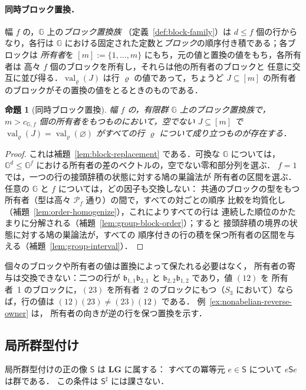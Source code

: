 \documentclass[11pt,a4paper]{ltjsarticle}
\numberwithin{equation}{section}
\theoremstyle{plain}
\newtheorem{proposition}[theorem]{命題}
\theoremstyle{definition}
\theoremstyle{remark}
\theoremstyle{plain}
\begin{document}
\paragraph{同時ブロック置換．}
幅 $f$ の，${\mathbb G}$ 上の\emph{ブロック置換族}
（定義~\ref{def:block-family}）は $d\le f$ 個の行からなり，各行は
${\mathbb G}$ における固定された定数と\emph{ブロック}の順序付き積である；各ブロックは
\emph{所有者}を $[m]:=\{1,\ldots,m\}$ にもち，元の値と置換の値をもち，各所有者は
高々 $f$ 個のブロックを所有し，それらは他の所有者のブロックと
任意に交互に並び得る．$\operatorname{val}_\varrho(J)$ は行 $\varrho$ の値であって，ちょうど
$J\subseteq[m]$ の所有者のブロックがその置換の値をとるときのものである．

\begin{proposition}[同時ブロック置換]
\label{prop:block-replacement-interface}
幅 $f$ の，有限群 ${\mathbb G}$ 上のブロック置換族で，
$m>c_{{\mathbb G},f}$ 個の所有者をもつものにおいて，空でない $J\subseteq[m]$ で
$\operatorname{val}_\varrho(J)=\operatorname{val}_\varrho(\varnothing)$ がすべての行 $\varrho$ について成り立つものが存在する．
\end{proposition}

\begin{proof}
これは補題~\ref{lem:block-replacement} である．可換な ${\mathbb G}$ については，
${\mathbb G}^d\le {\mathbb G}^f$ における所有者の差のベクトルの，空でない零和部分列を選ぶ．
$f=1$ では，一つの行の接頭辞積の状態に対する鳩の巣論法が
所有者の区間を選ぶ．任意の ${\mathbb G}$ と $f$ については，どの因子も交換しない：
共通のブロックの型をもつ所有者（型は高々 $\mathcal P_f$ 通り）の間で，すべての対ごとの順序
比較を均質化し（補題~\ref{lem:order-homogenize}），これによりすべての行は
連続した順位のかたまりに分解される（補題~\ref{lem:group-block-order}）；すると
接頭辞積の境界の状態に対する鳩の巣論法が，すべての
順序付きの行の積を保つ所有者の区間を与える（補題~\ref{lem:group-interval}）．
\end{proof}

個々のブロックや所有者の値は置換によって保たれる必要はなく，
所有者の寄与は交換できない：二つの行が
$\mathfrak b_{1,1}\mathfrak b_{2,1}$ と $\mathfrak b_{2,2}\mathfrak b_{1,2}$ であり，値 $(12)$ を
所有者~1 のブロックに，$(23)$ を所有者~2 のブロックにもつ（$S_3$ において）ならば，行の値は
$(12)(23)\ne(23)(12)$ である．
例~\ref{ex:nonabelian-reverse-owner} は，
所有者の向きが逆の行を保つ置換を示す．

\subsection{局所群型付け}
\label{subsec:algebraic-typed-data}
局所群型付けの正の像 $\mathsf S$ は $\mathbf{LG}$ に属する：
すべての冪等元 $e\in\mathsf S$ について $e\mathsf Se$ は群である．
この条件は $\mathsf S^\sharp$ には課さない．
\end{document}
